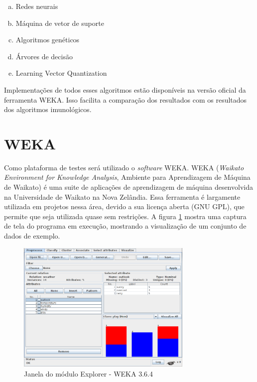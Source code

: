 \begin{enumerate}[a)]
    \item Redes neurais
    \item Máquina de vetor de suporte
    \item Algoritmos genéticos
    \item Árvores de decisão
    \item Learning Vector Quantization
\end{enumerate}

Implementações de todos esses algoritmos estão disponíveis na versão oficial da ferramenta WEKA. Isso facilita a comparação dos resultados com os resultados dos algoritmos imunológicos.

\section{WEKA}
\label{sec:prop_weka}

Como plataforma de testes será utilizado o \emph{software} WEKA. WEKA (\emph{Waikato Environment for Knowledge Analysis}, Ambiente para Aprendizagem de Máquina de Waikato) é uma suite de aplicações de aprendizagem de máquina desenvolvida na Universidade de Waikato na Nova Zelândia. Essa ferramenta é largamente utilizada em projetos nessa área, devido a sua licença aberta (GNU GPL), que permite que seja utilizada quase sem restrições. A figura \ref{fig:prop_weka} mostra uma captura de tela do programa em execução, mostrando a visualização de um conjunto de dados de exemplo.

\begin{figure}[h!]
    \centering
    \caption{Janela do módulo Explorer - WEKA 3.6.4}
    \label{fig:prop_weka}
    \includegraphics[width=0.75\textwidth]{img/weka.png}
\end{figure}

